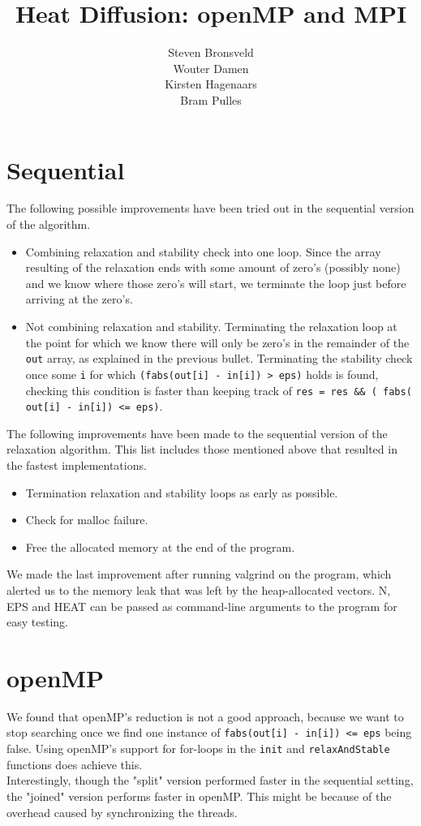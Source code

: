 \documentclass[a4paper]{article}
\author{Steven Bronsveld\\Wouter Damen\\Kirsten Hagenaars\\Bram Pulles}
\title{\textbf{Heat Diffusion: openMP and MPI}}
\begin{document}
\maketitle

\tableofcontents

\pagebreak
\section{Sequential}
The following possible improvements have been tried out in the sequential version of the algorithm.
\begin{itemize}
    \item Combining relaxation and stability check into one loop. Since the array resulting of the relaxation ends with some amount of zero's (possibly none) and we know where those zero's will start, we terminate the loop just before arriving at the zero's.
    \item Not combining relaxation and stability. Terminating the relaxation loop at the point for which we know there will only be zero's in the remainder of the \texttt{out} array, as explained in the previous bullet. Terminating the stability check once some \texttt{i} for which \texttt{(fabs(out[i] - in[i]) > eps)} holds is found, checking this condition is faster than keeping track of \texttt{res = res \&\& ( fabs( out[i] - in[i]) <= eps)}.
\end{itemize}
The following improvements have been made to the sequential version of the relaxation algorithm. This list includes those mentioned above that resulted in the fastest implementations.
\begin{itemize}
    \item Termination relaxation and stability loops as early as possible.
    \item Check for malloc failure.
    \item Free the allocated memory at the end of the program.
\end{itemize}
We made the last improvement after running valgrind on the program, which alerted us to the memory leak that was left by the heap-allocated vectors.
N, EPS and HEAT can be passed as command-line arguments to the program for easy testing.

\section{openMP}

We found that openMP's reduction is not a good approach, because we want to stop searching once we find one instance of \texttt{fabs(out[i] - in[i]) <= eps} being false. Using openMP's support for for-loops in the \texttt{init} and \texttt{relaxAndStable} functions does achieve this.\\
Interestingly, though the "split" version performed faster in the sequential setting, the "joined" version performs faster in openMP.
This might be because of the overhead caused by synchronizing the threads.
\end{document}
